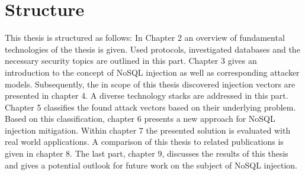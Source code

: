 \section{Structure}
This thesis is  structured as follows: In Chapter 2 an overview of fundamental technologies of the thesis is given. Used protocols, investigated databases and the necessary security topics are outlined in this part. Chapter 3 gives an introduction to the concept of NoSQL injection as well as corresponding attacker models. Subsequently, the in scope of this thesis discovered injection vectors are presented in chapter 4. A diverse technology stacks are addressed in this part. Chapter 5 classifies the found attack vectors based on their underlying problem. Based on this classification, chapter 6 presents a new approach for NoSQL injection mitigation. Within chapter 7 the presented solution is evaluated with real world applications. A comparison of this thesis to related publications is given in chapter 8. The last part, chapter 9, discusses the results of this thesis and gives a potential outlook for future work on the subject of NoSQL injection.